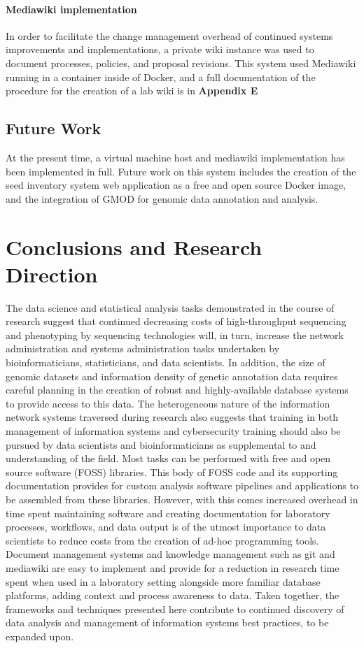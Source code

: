 \documentclass[12pt, letterpaper,oneocolumn]{article}
\begin{document}
	\paragraph{Mediawiki implementation}
	In order to facilitate the change management overhead of continued systems improvements and implementations, a private wiki instance was used to document processes, policies, and proposal revisions. This system used Mediawiki running in a container inside of Docker, and a full documentation of the procedure for the creation of a lab wiki is in \textbf{Appendix E}

	\subsection{Future Work}
	At the present time, a virtual machine host and mediawiki implementation has been implemented in full. Future work on this system includes the creation of the seed inventory system web application as a free and open source Docker image, and the integration of GMOD for genomic data annotation and analysis.

	\section{Conclusions and Research Direction}
	The data science and statistical analysis tasks demonstrated in the course of research suggest that continued decreasing costs of high-throughput sequencing and phenotyping by sequencing technologies will, in turn, increase the network administration and systems administration tasks undertaken by bioinformaticians, statisticians, and data scientists. In addition, the size of genomic datasets and information density of genetic annotation data requires careful planning in the creation of robust and highly-available database systems to provide access to this data. The heterogeneous nature of the information network systems traversed during research also suggests that training in both management of information systems and cybersecurity training should also be pursued by data scientists and bioinformaticians as supplemental to and understanding of the field. Most tasks can be performed with free and open source software (FOSS) libraries. This body of FOSS code and its supporting documentation provides for custom analysis software pipelines and applications to be assembled from these libraries. However, with this comes increased overhead in time spent maintaining software and creating documentation for laboratory processes, workflows, and data output is of the utmost importance to data scientists to reduce costs from the creation of ad-hoc programming tools. Document management systems and knowledge management such as git and mediawiki are easy to implement and provide for a reduction in research time spent when used in a laboratory setting alongside more familiar database platforms, adding context and process awareness to data. Taken together, the frameworks and techniques presented here contribute to continued discovery of data analysis and management of information systems best practices, to be expanded upon.
\end{document}

